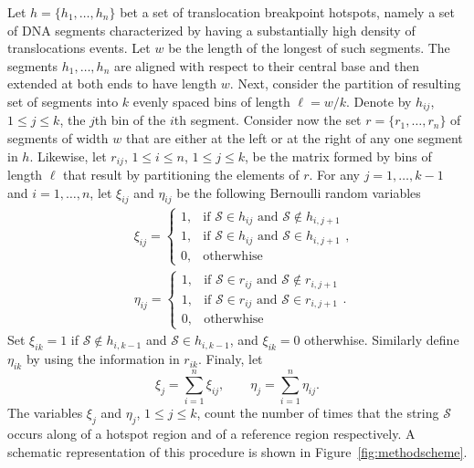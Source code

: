 \documentclass{bioinfo}
\begin{document}
Let $h = \{h_1, \ldots, h_n\}$ bet a set of translocation breakpoint hotspots, namely a set of DNA segments characterized by having a substantially
high density of translocations events. Let $w$ be the length of the
longest of such segments. The segments $h_1, \ldots, h_n$ are aligned
with respect to their central base and then extended at both ends to
have length $w$. Next, consider the partition of resulting set of
segments into $k$ evenly spaced bins of length $\ell = w/k$. Denote by
$h_{ij}$, $1 \leq j \leq k$, the $j$th bin of the $i$th
segment. Consider now the set $r= \{r_1, \ldots, r_n\}$ of segments of
width $w$ that are either at the left or at the right of any one
segment in $h$. Likewise, let $r_{ij}$, $1\leq i \leq n$, $1 \leq j
\leq k$, be the matrix formed by bins of length $\ell$ that result by
partitioning  the elements of $r$. For any $j = 1, \ldots, k-1$ and $i
= 1, \ldots, n$, let $\xi_{ij}$ and $\eta_{ij}$ be the following
Bernoulli random variables
\begin{align*}
   &\xi_{ij} = %
    \begin{cases}
     1, &\text{if } \mathcal S \in h_{ij} \text{ and } \mathcal S 
     \notin h_{i,j+1}\\
     1, &\text{if } \mathcal S \in h_{ij} \text{ and } \mathcal S 
     \in h_{i,j+1}\\
     0, &\text{otherwhise}
    \end{cases},\\
   &\eta_{ij} = %
    \begin{cases}
     1, &\text{if } \mathcal S \in r_{ij} \text{ and } \mathcal S 
     \notin r_{i,j+1}\\
     1, &\text{if } \mathcal S \in r_{ij} \text{ and } \mathcal S 
     \in r_{i,j+1}\\
     0, &\text{otherwhise}
    \end{cases}.
\end{align*}
Set $\xi_{ik}  = 1$ if $\mathcal S \notin h_{i,k-1}$ and $\mathcal S
\in h_{i,k-1}$, and $\xi_{ik} = 0$ otherwhise. Similarly define
$\eta_{ik}$ by using the information in $r_{ik}$. Finaly, let 
\[
   \xi_j = \sum_{i=1}^n \xi_{ij}, \qquad 
   \eta_j = \sum_{i=1}^n \eta_{ij}.
\]
The variables $\xi_j$ and $\eta_j$, $1 \leq j \leq k$, count the
number of times that the string $\mathcal S$ occurs along of a hotspot
region and of a reference region respectively.  A schematic representation of  this procedure is shown in Figure~\ref{fig:methodscheme}.
\end{document}
